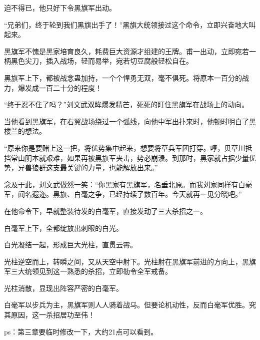 \begin{this_body}
迫不得已，他只好下令黑旗军出动。

“兄弟们，终于轮到我们黑旗出手了！”黑旗大统领接过这个命令，立即兴奋地大叫起来。

黑旗军不愧是黑家培育良久，耗费巨大资源才组建的王牌。甫一出动，立即宛若一柄黑色尖刀，插入战场，轻而易举，宛若切豆腐般轻松自在。

黑旗军上下，都被战念蛊加持，一个个悍勇无双，毫不俱死。将原本一百分的战力，爆发成一百二十分的程度！

“终于忍不住了吗？”刘文武双眸爆发精芒，死死的盯住黑旗军在战场上的动向。

当他看到黑旗军，在右翼战场绕过一个弧线，向他中军出扑来时，他顿时明白了黑楼兰的想法。

“原来你是要赌上这一把，将优势集中起来，想要将草兵军团打穿。哼，贝草川抵挡常山阴本就艰难，如果再被黑旗军夹击，势必崩溃。到那时，黑家就占据少量优势，异兽狼群这支最关键的力量，也能解放出来。”

念及于此，刘文武傲然一笑：“你黑家有黑旗军，名垂北原。而我刘家同样有白毫军，闻名遐迩。黑旗、白毫之争，已经持续了数百年。今天就再一见分晓吧。”

在他命令下，早就整装待发的白毫军，直接发动了三大杀招之一。

白毫军上下，全都绽放出刺眼的白光。

白光凝结一起，形成巨大光柱，直贯云霄。

光柱逆空而上，转瞬之间，又从天空中射下。光柱射在黑旗军前进的方向上，黑旗军三大统领见到这一熟悉的杀招，立即勒令全军戒备。

光柱消散，显现出阵容严密的白毫军。

白毫军以步兵为主，黑旗军则人人骑着战马。但要论机动性，反而白毫军优胜。究其原因，这一杀招居功至伟！

ps：第三章要临时修改一下，大约21点可以看到。

\end{this_body}

